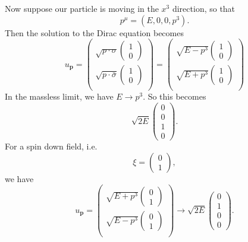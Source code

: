 \documentclass[a4paper]{article}
\begin{document}
Now suppose our particle is moving in the $x^3$ direction, so that
\[
  p^\mu = (E, 0, 0, p^3).
\]
Then the solution to the Dirac equation becomes
\[
  u_\mathbf{p} =
  \begin{pmatrix}
    \sqrt{p\cdot \sigma}
    \begin{pmatrix}
      1\\0
    \end{pmatrix}\\
    \sqrt{p\cdot \bar\sigma}
    \begin{pmatrix}
      1\\0
    \end{pmatrix}\\
  \end{pmatrix}
  =
  \begin{pmatrix}
    \sqrt{E - p^3}
    \begin{pmatrix}
      1\\0
    \end{pmatrix}\\
    \sqrt{E + p^3}
    \begin{pmatrix}
      1\\0
    \end{pmatrix}\\
  \end{pmatrix}
\]
In the massless limit, we have $E \to p^3$. So this becomes
\[
  \sqrt{2E}
  \begin{pmatrix}
    0\\0\\1\\0
  \end{pmatrix}.
\]
For a spin down field, i.e.
\[
  \xi =
  \begin{pmatrix}
    0\\1
  \end{pmatrix},
\]
we have
\[
  u_\mathbf{p} =
  \begin{pmatrix}
    \sqrt{E + p^3}
    \begin{pmatrix}
      0\\1
    \end{pmatrix}\\
    \sqrt{E - p^3}
    \begin{pmatrix}
      0\\1
    \end{pmatrix}\\
  \end{pmatrix}
  \to
  \sqrt{2E}
  \begin{pmatrix}
    0\\1\\0\\0
  \end{pmatrix}.
\]
\end{document}
